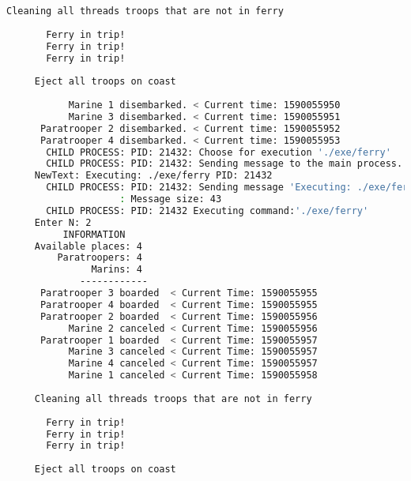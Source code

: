\documentclass{article}
\begin{document}
\begin{lstlisting}[language=BASH]
     Cleaning all threads troops that are not in ferry
     
       Ferry in trip!
       Ferry in trip!
       Ferry in trip!
     
     Eject all troops on coast
     
           Marine 1 disembarked. < Current time: 1590055950
           Marine 3 disembarked. < Current time: 1590055951
      Paratrooper 2 disembarked. < Current time: 1590055952
      Paratrooper 4 disembarked. < Current time: 1590055953
       CHILD PROCESS: PID: 21432: Choose for execution './exe/ferry'
       CHILD PROCESS: PID: 21432: Sending message to the main process...
     NewText: Executing: ./exe/ferry PID: 21432
       CHILD PROCESS: PID: 21432: Sending message 'Executing: ./exe/ferry PID: 21432' to the MAIN process...
                    : Message size: 43
       CHILD PROCESS: PID: 21432 Executing command:'./exe/ferry'
     Enter N: 2
          INFORMATION
     Available places: 4
         Paratroopers: 4
               Marins: 4
             ------------
      Paratrooper 3 boarded  < Current Time: 1590055955 
      Paratrooper 4 boarded  < Current Time: 1590055955 
      Paratrooper 2 boarded  < Current Time: 1590055956 
           Marine 2 canceled < Current Time: 1590055956 
      Paratrooper 1 boarded  < Current Time: 1590055957 
           Marine 3 canceled < Current Time: 1590055957 
           Marine 4 canceled < Current Time: 1590055957 
           Marine 1 canceled < Current Time: 1590055958 
     
     Cleaning all threads troops that are not in ferry
     
       Ferry in trip!
       Ferry in trip!
       Ferry in trip!
     
     Eject all troops on coast
     

\end{lstlisting}
\end{document}
